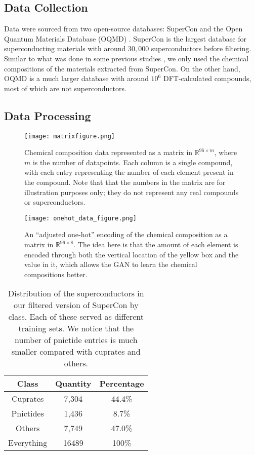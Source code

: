 \subsection{Data Collection}

Data were sourced from two open-source databases: SuperCon \cite{supercon.nims.go.jp} and the Open Quantum Materials Database (OQMD) \cite{Saal2013,Kirklin2015}. SuperCon is the largest database for superconducting materials with around $30,000$ superconductors before filtering. Similar to what was done in some previous studies \cite{ROTER20201353689,ROTER20221354078}, 
we only used the chemical compositions of the materials extracted from SuperCon. On the other hand, OQMD is a much larger database with around $10^6$ DFT-calculated compounds, most of which are not superconductors.

\subsection{Data Processing}
\label{sec:dataprocess}
\begin{figure}
    \centering
    \texttt{[image: matrixfigure.png]}
    \caption{Chemical composition data represented as a matrix \cite{ROTER20201353689} in $\mathbb{R}^{96\times m}$, where $m$ is the number of datapoints. Each column is a single compound, with each entry representing the number of each element present in the compound. Note that that the numbers in the matrix are for illustration purposes only; they do not represent any real compounds or superconductors.}
    \label{fig:matrixrepresentation}
\end{figure}

\begin{figure}
    \centering
    \texttt{[image: onehot\_data\_figure.png]}
    \caption{An ``adjusted one-hot'' encoding of the chemical composition as a matrix in $\mathbb R ^{96 \times 8}$. The idea here is that the amount of each element is encoded through both the vertical location of the yellow box and the value in it, which allows the GAN to learn the chemical compositions better.}
    \label{fig:dataf}
\end{figure}

\begin{table}
    \centering
    \begin{ruledtabular}
    \begin{tabular}{ccc}
        Class & Quantity & Percentage  \\
        \hline
        Cuprates & 7,304 & 44.4\% \\
        Pnictides & 1,436 & 8.7\% \\
        Others & 7,749 & 47.0\% \\\hline
        Everything & 16489 & 100\%
    \end{tabular}
    \end{ruledtabular}
    \caption{Distribution of the superconductors in our filtered version of SuperCon by class. Each of these served as different training sets.
    We notice that the number of pnictide entries is much smaller compared with cuprates and others. }
    \label{tab:class_distributions}
\end{table}

